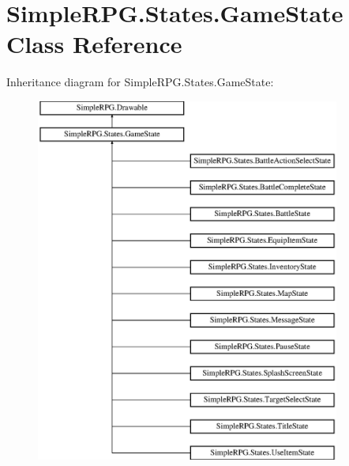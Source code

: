\hypertarget{class_simple_r_p_g_1_1_states_1_1_game_state}{\section{Simple\-R\-P\-G.\-States.\-Game\-State Class Reference}
\label{class_simple_r_p_g_1_1_states_1_1_game_state}
}
Inheritance diagram for Simple\-R\-P\-G.\-States.\-Game\-State\-:\begin{figure}[H]
\begin{center}
\leavevmode
\includegraphics[height=12.000000cm]{class_simple_r_p_g_1_1_states_1_1_game_state}
\end{center}
\end{figure}
